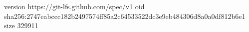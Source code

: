 version https://git-lfs.github.com/spec/v1
oid sha256:2747eabccc182b2497574ff85a2c64533522dc3e9eb484306d8a0a0df812b6e1
size 329911
